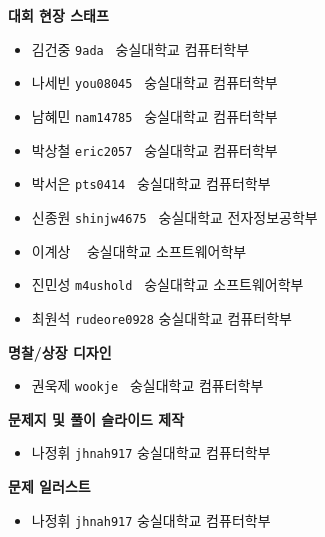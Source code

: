    \begin{frame}%
        \textbf{대회 현장 스태프} %
        \begin{itemize}
            \item 김건중 \tabto{1.2cm} \texttt{9ada       } \tabto{4cm} {\color{gray} } \tabto{8cm} {\color{gray} 숭실대학교 컴퓨터학부}
            \item 나세빈 \tabto{1.2cm} \texttt{you08045   } \tabto{4cm} {\color{gray} } \tabto{8cm} {\color{gray} 숭실대학교 컴퓨터학부}
            \item 남혜민 \tabto{1.2cm} \texttt{nam14785   } \tabto{4cm} {\color{gray} } \tabto{8cm} {\color{gray} 숭실대학교 컴퓨터학부}
            \item 박상철 \tabto{1.2cm} \texttt{eric2057   } \tabto{4cm} {\color{gray} } \tabto{8cm} {\color{gray} 숭실대학교 컴퓨터학부}
            \item 박서은 \tabto{1.2cm} \texttt{pts0414    } \tabto{4cm} {\color{gray} } \tabto{8cm} {\color{gray} 숭실대학교 컴퓨터학부}
            \item 신종원 \tabto{1.2cm} \texttt{shinjw4675 } \tabto{4cm} {\color{gray} } \tabto{8cm} {\color{gray} 숭실대학교 전자정보공학부}
            \item 이계상 \tabto{1.2cm} \texttt{           } \tabto{4cm} {\color{gray} } \tabto{8cm} {\color{gray} 숭실대학교 소프트웨어학부}
            \item 진민성 \tabto{1.2cm} \texttt{m4ushold   } \tabto{4cm} {\color{gray} } \tabto{8cm} {\color{gray} 숭실대학교 소프트웨어학부}
            \item 최원석 \tabto{1.2cm} \texttt{rudeore0928} \tabto{4cm} {\color{gray} } \tabto{8cm} {\color{gray} 숭실대학교 컴퓨터학부}
        \end{itemize}
    \end{frame}

    \begin{frame}%
        \textbf{명찰/상장 디자인} %
        \begin{itemize}
            \item 권욱제 \tabto{1.2cm} \texttt{wookje  } \tabto{4cm} {\color{gray} } \tabto{8cm} {\color{gray} 숭실대학교 컴퓨터학부}
        \end{itemize}
        \vspace{3mm}
        \textbf{문제지 및 풀이 슬라이드 제작} %
        \begin{itemize}
            \item 나정휘 \tabto{1.2cm} \texttt{jhnah917} \tabto{4cm} {\color{gray} } \tabto{8cm} {\color{gray} 숭실대학교 컴퓨터학부}
        \end{itemize}
        \vspace{3mm}
        \textbf{문제 일러스트} %
        \begin{itemize}
            \item 나정휘 \tabto{1.2cm} \texttt{jhnah917} \tabto{4cm} {\color{gray} } \tabto{8cm} {\color{gray} 숭실대학교 컴퓨터학부}
        \end{itemize}
    \end{frame}
    
